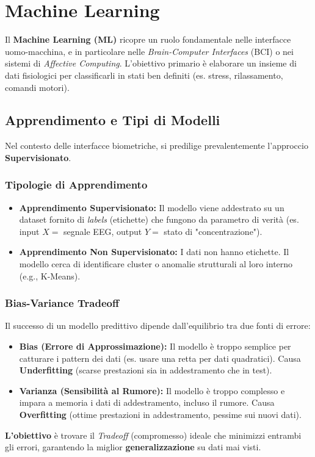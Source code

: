 \chapter{Machine Learning}

Il \textbf{Machine Learning (ML)} ricopre un ruolo fondamentale nelle interfacce uomo-macchina, e in particolare nelle \textit{Brain-Computer Interfaces} (BCI) o nei sistemi di \textit{Affective Computing}.
L'obiettivo primario è elaborare un insieme di dati fisiologici per classificarli in stati ben definiti (es. stress, rilassamento, comandi motori).

\section{Apprendimento e Tipi di Modelli}
Nel contesto delle interfacce biometriche, si predilige prevalentemente l'approccio \textbf{Supervisionato}.

\subsection{Tipologie di Apprendimento}
\begin{itemize}
    \item \textbf{Apprendimento Supervisionato:} Il modello viene addestrato su un dataset fornito di \textit{labels} (etichette) che fungono da parametro di verità (es. input $X=$ segnale EEG, output $Y=$ stato di "concentrazione").
    \item \textbf{Apprendimento Non Supervisionato:} I dati non hanno etichette.
    Il modello cerca di identificare cluster o anomalie strutturali al loro interno (e.g., K-Means).
\end{itemize}

\subsection{Bias-Variance Tradeoff}
Il successo di un modello predittivo dipende dall'equilibrio tra due fonti di errore:
\begin{itemize}
    \item \textbf{Bias (Errore di Approssimazione):} Il modello è troppo semplice per catturare i pattern dei dati (es.
    usare una retta per dati quadratici).
    Causa \textbf{Underfitting} (scarse prestazioni sia in addestramento che in test).
    \item \textbf{Varianza (Sensibilità al Rumore):} Il modello è troppo complesso e impara a memoria i dati di addestramento, incluso il rumore.
    Causa \textbf{Overfitting} (ottime prestazioni in addestramento, pessime sui nuovi dati).
\end{itemize}
\textbf{L'obiettivo} è trovare il \textit{Tradeoff} (compromesso) ideale che minimizzi entrambi gli errori, garantendo la miglior \textbf{generalizzazione} su dati mai visti.
